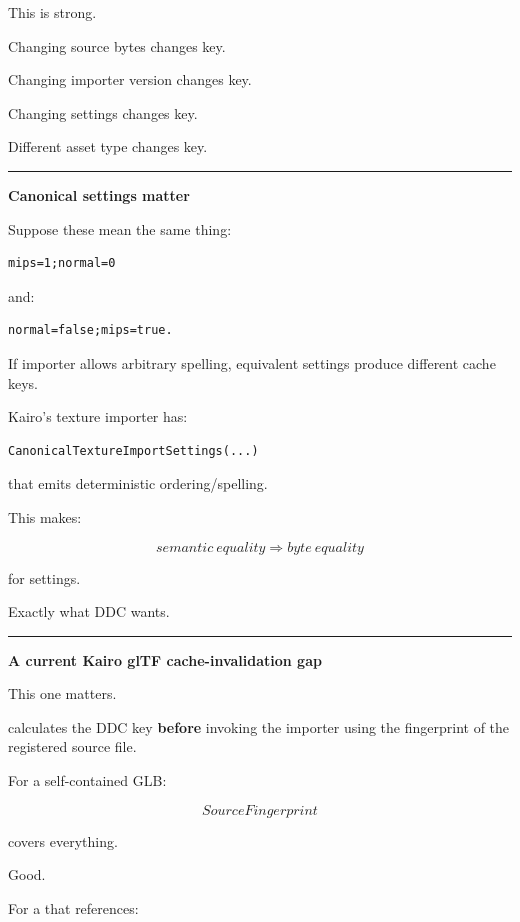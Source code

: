 This is strong.

Changing source bytes changes key.

Changing importer version changes key.

Changing settings changes key.

Different asset type changes key.

\begin{center}\rule{0.5\linewidth}{0.5pt}\end{center}

\textbf{Canonical settings matter}

Suppose these mean the same thing:

\begin{verbatim}
mips=1;normal=0
\end{verbatim}

and:

\begin{verbatim}
normal=false;mips=true.
\end{verbatim}

If importer allows arbitrary spelling, equivalent settings produce different cache keys.

Kairo's texture importer has:

\begin{verbatim}
CanonicalTextureImportSettings(...)
\end{verbatim}

that emits deterministic ordering/spelling.

This makes:

\[
semantic\ equality
\Rightarrow
byte\ equality
\]

for settings.

Exactly what DDC wants.

\begin{center}\rule{0.5\linewidth}{0.5pt}\end{center}

\textbf{A current Kairo glTF cache-invalidation gap}

This one matters.

 calculates the DDC key \textbf{before} invoking the importer using the fingerprint of the registered source file.

For a self-contained GLB:

\[
SourceFingerprint
\]

covers everything.

Good.

For a  that references:


